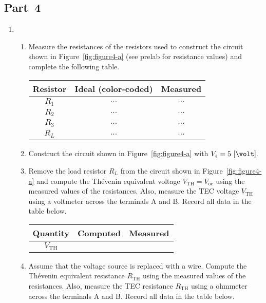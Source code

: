 \subsection{Part~4}
\label{sec:part4}

\begin{enumerate}
\item     

\begin{enumerate}
\item Measure the resistances of the resistors used to construct the circuit shown in Figure~\ref{fig:figure4-a} (see prelab for resistance values) and complete the following table.

  \begin{center}
    \begin{tabular}{c|c|c}
      \toprule
      Resistor &  Ideal (color-coded) & Measured\\
      \toprule
      $R_1$ & $\ldots$ & $\ldots$\\   %
      $R_2$ & $\ldots$ & $\ldots$\\   %
      $R_3$ & $\ldots$ & $\ldots$\\   %
      $R_L$ & $\ldots$ & $\ldots$\\   %
      \bottomrule
    \end{tabular}    
  \end{center}

  
\item Construct the circuit shown in Figure~\ref{fig:figure4-a} with $V_s = 5~[\volt].$

  
\item Remove the load resistor $R_L$ from the  circuit shown in Figure~\ref{fig:figure4-a} and compute the Th\'{e}venin equivalent voltage $V_{\mathrm{TH}}=V_{\mathrm{oc}}$ using the measured values of the resistances.  Also, measure the TEC voltage $V_{\mathrm{TH}}$ using a voltmeter across the terminals A and B. Record all data in the table below. %

    
  \begin{center}
    \begin{tabular}{|c|c|c|}
      \toprule
      Quantity & Computed & Measured\\
      \toprule
      $V_{\mathrm{TH}}$ & & \\
      \bottomrule
    \end{tabular}    
  \end{center}
  
\item Assume that the voltage source is replaced with a wire. Compute the Th\'{e}venin equivalent resistance $R_{\mathrm{TH}}$ using the measured values of the resistances.  Also, measure the TEC resistance $R_{\mathrm{TH}}$ using a ohmmeter across the terminals A and B. Record all data in the table below. %
    

\end{enumerate}
\end{enumerate}
